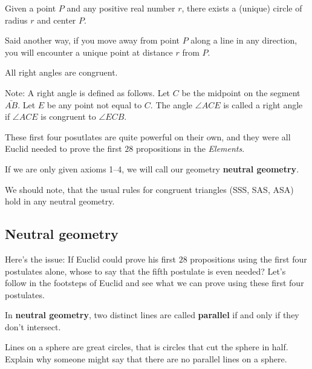 \documentclass[noauthor,nooutcomes,12pt,hints,handout,newpage]{ximera}
\begin{document}
\begin{axiom}
Given a point $P$ and any positive real number $r$, there exists a
(unique) circle of radius $r$ and center $P$. 

Said another way, if you move away from point $P$ along a line in any
direction, you will encounter a unique point at distance $r$ from $P$.
\end{axiom}

\begin{axiom}
All right angles are congruent.

Note: A right angle is defined as follows. Let $C$ be the midpoint on
the segment $\bar{AB}$. Let $E$ be any point not equal to
$C$. The angle $\angle ACE$ is called a right angle if $\angle ACE$ is
congruent to $\angle ECB$. 
\end{axiom}

These first four posutlates are quite powerful on their own, and they
were all Euclid needed to prove the first $28$ propositions in the
\textit{Elements}.


\begin{definition}
If we are only given axioms 1--4, we will call our geometry
\textbf{neutral geometry}.
\end{definition}


We should note, that the usual rules for congruent triangles (SSS, SAS,
ASA) hold in any neutral geometry.



\subsection{Neutral geometry}


Here's the issue: If Euclid could prove his first $28$ propositions
using the first four postulates alone, whose to say that the fifth
postulate is even needed?  Let's follow in the footsteps of Euclid and
see what we can prove using these first four postulates.



\begin{definition}
In \textbf{neutral geometry}, two distinct lines are called \textbf{parallel} if and
only if they don't intersect.
\end{definition}





\begin{problem}
 Lines on a sphere are great circles, that is circles that cut the
 sphere in half. Explain why someone might say that there are no
 parallel lines on a sphere.
\end{problem}
   
\end{document}
